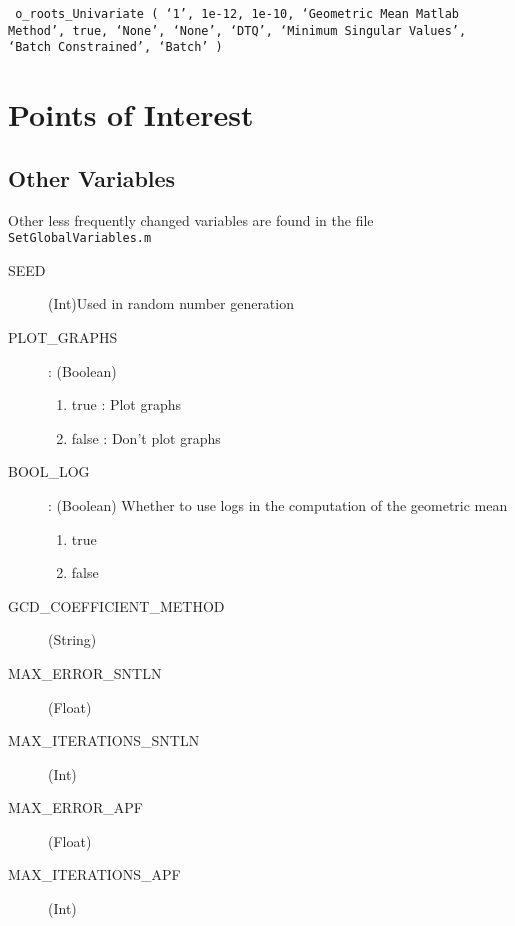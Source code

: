 \documentclass{article}
\begin{document}
\texttt
	{
		o\_roots\_Univariate
		(
			`1',
			 1e-12, 
			 1e-10, 
			 `Geometric Mean Matlab Method', 
			 true, 
			 `None', 
			 `None', 
			 `DTQ',
			 `Minimum Singular Values',
			 `Batch Constrained',
			 `Batch'
		)}

\section{Points of Interest}

\subsection{Other Variables}
Other less frequently changed variables are found in the file \texttt{SetGlobalVariables.m}

\begin{description}
	\item[SEED] (Int)Used in random number generation
	
	\item[PLOT\_GRAPHS] : (Boolean) 
		\begin{enumerate}
		\item true : Plot graphs
		\item false : Don't plot graphs
		\end{enumerate}
	
	\item[BOOL\_LOG] : (Boolean) Whether to use logs in the computation of the geometric mean
		\begin{enumerate}
		\item true
		\item false
		\end{enumerate}
	
	
	\item[GCD\_COEFFICIENT\_METHOD] (String)
	
	\item[MAX\_ERROR\_SNTLN] (Float)
	
	\item[MAX\_ITERATIONS\_SNTLN] (Int)
	
	\item[MAX\_ERROR\_APF] (Float)
		
	\item[MAX\_ITERATIONS\_APF] (Int)
		

\end{description}
\end{document}
